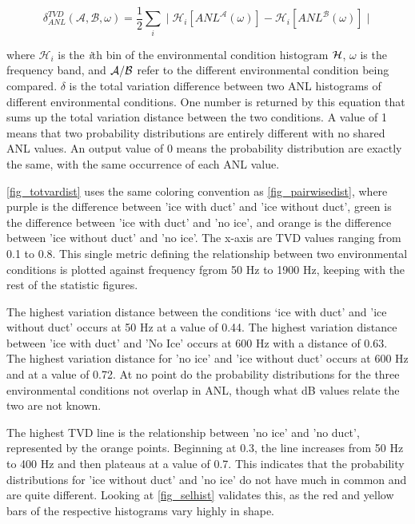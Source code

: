 
\begin{equation} \label{tdv_eq}
    \delta ^{TVD} _{ANL} ( \mathcal{A}, \mathcal{B}, \omega) = \frac{1}{2} \sum _{i} ^{} \mid \mathcal{H}_{i} [ANL^{\mathcal{A}}(\omega)] -\mathcal{H}_{i} [ANL^{\mathcal{B}}(\omega)] \mid 
\end{equation}

where  $\mathcal{H}_{i}$ is the \textit{i}th bin of the environmental condition histogram $\cal{H}$, $\omega$ is the frequency band, and $\cal{A/B}$ refer to the different environmental condition being compared. $\delta$ is the total variation difference between two ANL histograms of different environmental conditions. One number is returned by this equation that sums up the total variation distance between the two conditions. A value of 1 means that two probability distributions are entirely different with no shared ANL values. An output value of 0 means the probability distribution are exactly the same, with the same occurrence of each ANL value.

\autoref{fig_totvardist} uses the same coloring convention as \autoref{fig_pairwisedist}, where purple is the difference between 'ice with duct' and 'ice without duct', green is the difference between 'ice with duct' and 'no ice', and orange is the difference between 'ice without duct' and 'no ice'. The x-axis are TVD values ranging from 0.1 to 0.8. This single metric defining the relationship between two environmental conditions is plotted against frequency fgrom 50 Hz to 1900 Hz, keeping with the rest of the statistic figures.

 The highest variation distance between the conditions ‘ice with duct' and 'ice without duct’ occurs at 50 Hz at a value of 0.44. The highest variation distance between 'ice with duct' and 'No Ice' occurs at 600 Hz with a distance of 0.63. The highest variation distance for 'no ice' and 'ice without duct' occurs at 600 Hz and at a value of 0.72. At no point do the probability distributions for the three environmental conditions not overlap in ANL, though what dB values relate the two are not known. 

The highest TVD line is the relationship between 'no ice' and 'no duct', represented by the orange points. Beginning at 0.3, the line increases from 50 Hz to 400 Hz and then plateaus at a value of 0.7. This indicates that the probability distributions for 'ice without duct' and 'no ice' do not have much in common and are quite different. Looking at \autoref{fig_selhist} validates this, as the red and yellow bars of the respective histograms vary highly in shape.

